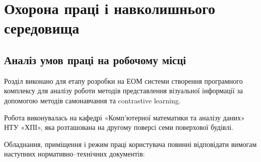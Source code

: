 \section{Охорона праці і навколишнього середовища}

\subsection{Аналіз умов праці на робочому місці}

Розділ виконано для етапу розробки на ЕОМ системи створення програмного комплексу для аналізу роботи методів представлення візуальної інформації за допомогою методів самонавчання та contrastive learning.

Робота виконувалась на кафедрі «Комп’ютерної математики та аналізу даних» НТУ «ХПІ», яка розташована на другому поверсі семи поверхової будівлі.

Обладнання, приміщення і режим праці користувача повинні відповідати вимогам наступних нормативно–технічних документів:

